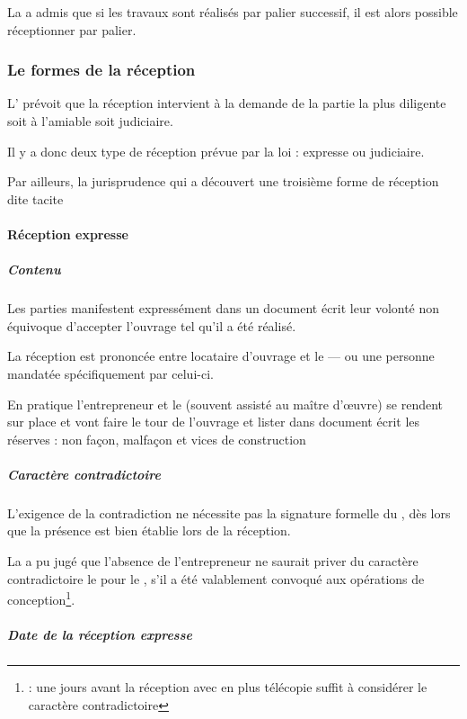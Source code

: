 			\medbreak La \CourDeCas a admis que si les travaux sont réalisés par palier successif, il est alors possible réceptionner par palier. \aValider



		\subsubsection{Le formes de la réception}

			L' prévoit que la réception intervient à la demande de la partie la plus diligente soit à l’amiable soit judiciaire.


			Il y a donc deux type de réception prévue par la loi : expresse ou judiciaire.

			Par ailleurs, la jurisprudence qui a découvert une troisième forme de réception dite tacite

			\paragraph{Réception expresse}\label{receptionExpresse}

			\subparagraph{Contenu}

			Les parties manifestent expressément dans un document écrit leur volonté non équivoque d’accepter l’ouvrage tel qu’il a été réalisé.

			La réception est prononcée entre locataire d’ouvrage et le \MO --- ou une personne mandatée spécifiquement par celui-ci.

			En pratique l’entrepreneur et le \MO (souvent assisté au maître d’œuvre) se rendent sur place et vont faire le tour de l’ouvrage et lister dans document écrit les réserves : non façon, malfaçon et vices de construction

			\subparagraph{Caractère contradictoire}

			L’exigence de la contradiction ne nécessite pas la signature formelle du \PV, dès lors que la présence est bien établie lors de la réception.

			La \CourDeCas a pu jugé que l’absence de l’entrepreneur ne saurait priver du caractère contradictoire le \PV pour le \MO, s’il a été valablement convoqué aux opérations de conception\footnote{ : une  jours avant la réception avec en plus télécopie suffit à considérer le caractère contradictoire}.

			\subparagraph{Date de la réception expresse}


